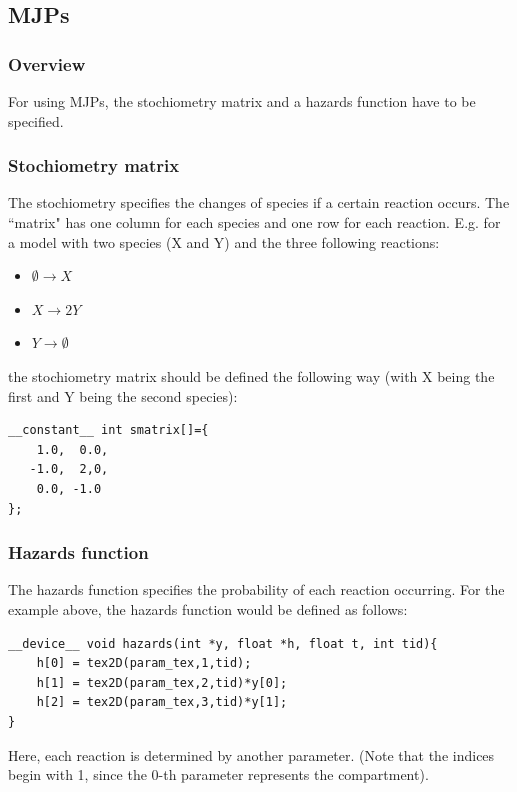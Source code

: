 \documentclass [11pt, a4paper, openany, twoside=off] {article}
\begin{document}
\subsection{MJPs}
\subsubsection{Overview}
For using MJPs, the stochiometry matrix and a hazards function have to be specified.

\subsubsection{Stochiometry matrix}
The stochiometry specifies the changes of species if a certain reaction occurs. The ``matrix" has one column for each species and one row for each reaction. E.g. for a model with two species (X and Y) and the three following reactions:
\begin{itemize}
    \item $\emptyset \rightarrow X$
    \item $X \rightarrow 2Y$
    \item $Y \rightarrow \emptyset$
\end{itemize}
the stochiometry matrix should be defined the following way (with X being the first and Y being the second species):
\begin{verbatim}
__constant__ int smatrix[]={
    1.0,  0.0,
   -1.0,  2,0,
    0.0, -1.0
};
\end{verbatim}

\subsubsection{Hazards function}
The hazards function specifies the probability of each reaction occurring. For the example above, the hazards function would be defined as follows:
\begin{verbatim}
__device__ void hazards(int *y, float *h, float t, int tid){
    h[0] = tex2D(param_tex,1,tid);
    h[1] = tex2D(param_tex,2,tid)*y[0];
    h[2] = tex2D(param_tex,3,tid)*y[1];
}
\end{verbatim}
Here, each reaction is determined by another parameter. (Note that the indices begin with 1, since the 0-th parameter represents the compartment).

\end{document}
